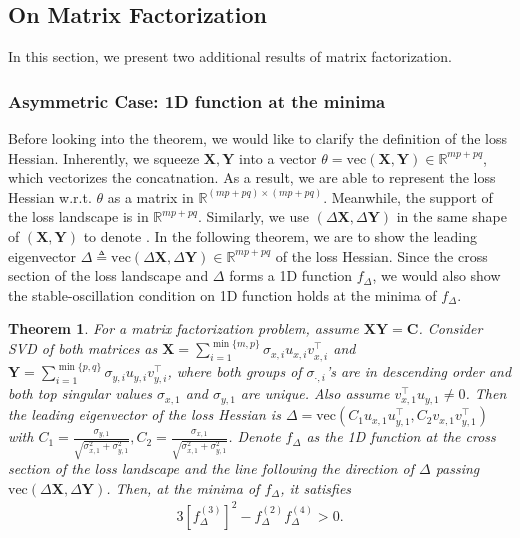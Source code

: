 \documentclass{article}
\theoremstyle{plain}
\newtheorem{theorem}{Theorem}
\theoremstyle{remark}
\def\R{\mathbb{R}}
\begin{document}
\subsection{On Matrix Factorization}\label{app:add_res_mf}

In this section, we present two additional results of matrix factorization.

\subsubsection{Asymmetric Case: 1D function at the minima}

Before looking into the theorem, we would like to clarify the definition of the loss Hessian. Inherently, we squeeze $\mathbf{X},\mathbf{Y}$ into a vector $\theta=\text{vec}(\mathbf{X},\mathbf{Y})\in\R^{mp+pq}$, which vectorizes the concatnation. As a result, we are able to represent the loss Hessian w.r.t. $\theta$ as a matrix in $\R^{(mp+pq)\times(mp+pq)}$. Meanwhile, the support of the loss landscape is in $\R^{mp+pq}$. Similarly, we use $(\Delta\mathbf{X},\Delta\mathbf{Y})$ in the same shape of $(\mathbf{X},\mathbf{Y})$ to denote . In the following theorem, we are to show the leading eigenvector $\Delta\triangleq \text{vec}(\Delta\mathbf{X}, \Delta\mathbf{Y})\in\R^{mp+pq}$ of the loss Hessian. Since the cross section of the loss landscape and $\Delta$ forms a 1D function $f_{\Delta}$, we would also show the stable-oscillation condition on 1D function holds at the minima of $f_{\Delta}$.

\begin{theorem}
    For a matrix factorization problem, assume $\mathbf{X}\mathbf{Y}=\mathbf{C}$.
    Consider SVD of both matrices as $\mathbf{X} = \sum_{i=1}^{\min\{m,p\}} \sigma_{x,i} u_{x,i} v_{x,i}^\top$ and $\mathbf{Y} = \sum_{i=1}^{\min\{p,q\}} \sigma_{y,i} u_{y,i} v_{y,i}^\top$, where both groups of $\sigma_{\cdot,i}$'s are in descending order and both top singular values $\sigma_{x,1}$ and $\sigma_{y,1}$ are unique. Also assume $v_{x,1}^\top u_{y,1}\neq 0$. Then the leading eigenvector of the loss Hessian is $\Delta=\text{vec}(C_1 u_{x,1}u_{y,1}^\top, C_2 v_{x,1}v_{y,1}^\top)$ with $C_1=\frac{\sigma_{y,1}}{\sqrt{\sigma_{x,1}^2+\sigma_{y,1}^2}}, C_2=\frac{\sigma_{x,1}}{\sqrt{\sigma_{x,1}^2+\sigma_{y,1}^2}}$. Denote $f_\Delta$ as the 1D function at the cross section of the loss landscape and the line following the direction of $\Delta$ passing $\text{vec}(\Delta\mathbf{X}, \Delta\mathbf{Y})$. Then, at the minima of $f_\Delta$, it satisfies
    \begin{align}
        3[f_\Delta^{(3)}]^2 - f_\Delta^{(2)}f_\Delta^{(4)}>0.
    \end{align}
    \label{thm:mf_1d_cond}
\end{theorem}
\end{document}
